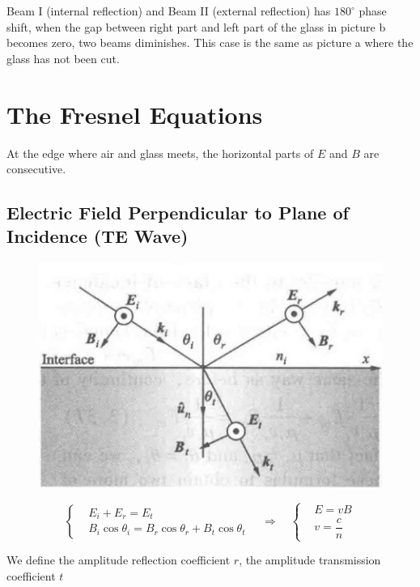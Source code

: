 Beam I (internal reflection) and Beam II (external reflection) has $180^{\circ}$ phase shift, when the gap between right part and left part of the glass in picture b becomes zero, two beams diminishes. This case is the same as picture a where the glass has not been cut.

\section{The Fresnel Equations}

At the edge where air and glass meets, the horizontal parts of $E$ and $B$ are consecutive.

\subsection{Electric Field Perpendicular to Plane of Incidence (TE Wave)}

\begin{figure}[H]
  \centering
  \includegraphics[width=0.4\linewidth]{figures/Fresnel-perpendicular}
\end{figure}

\begin{equation*}
 \left\{
  \begin{aligned}
    & E_i + E_r = E_t \\
    & B_i \cos \theta_i = B_r \cos \theta_r + B_t \cos \theta_t
  \end{aligned}
  \right.
  \quad \Rightarrow \quad
  \left\{
  \begin{aligned}
    & E = v B \\
    & v = \dfrac{c}{n}
  \end{aligned}
  \right.
\end{equation*}

We define the amplitude reflection coefficient $r$, the amplitude transmission coefficient $t$

